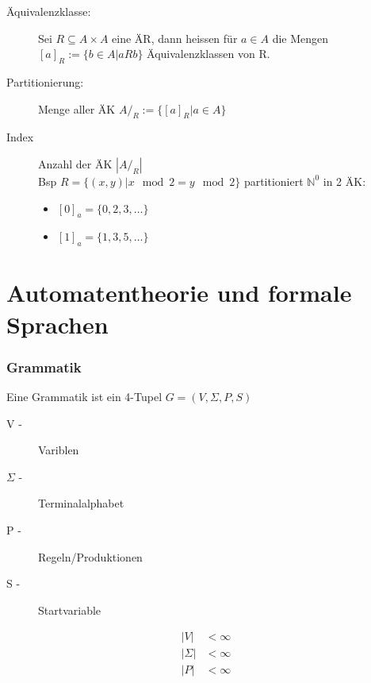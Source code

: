 \documentclass{scrartcl}
\begin{document}
\begin{description}
    \item[Äquivalenzklasse:] Sei $R \subseteq A\times A$ eine ÄR, dann heissen für $a\in A$ die Mengen $[a]_R:=\{b\in A | aRb\}$ Äquivalenzklassen von R.
    \item[Partitionierung:] Menge aller ÄK $A/_R:=\{[a]_R | a\in A\}$
    \item[Index] Anzahl der ÄK $|A/_R|$ \\
    Bsp $R=\{(x,y) | x \mod 2 = y \mod 2\}$ partitioniert $\mathds{N}^0$ in 2 ÄK:
    \begin{itemize}
        \item $[0]_a = \{0,2,3,\dots\}$
        \item $[1]_a = \{1,3,5,\dots\}$
    \end{itemize}
\end{description}

\part{Automatentheorie und formale Sprachen}
\section*{Grammatik}
Eine Grammatik ist ein 4-Tupel $G=(V,\Sigma,P,S)$ \\[.5cm]
\begin{minipage}[t]{4.5cm}
\begin{description}
\item[V -] Variblen
\item[$\Sigma$ -] Terminalalphabet
\item[P -] Regeln/Produktionen
\item[S -] Startvariable
\end{description}
\end{minipage}
\begin{minipage}[t]{10cm}
    \begin{align*}
        |V|         & < \infty \\
        |\Sigma|    & < \infty \\
        |P|         & < \infty
    \end{align*}
\end{minipage}
\end{document}
